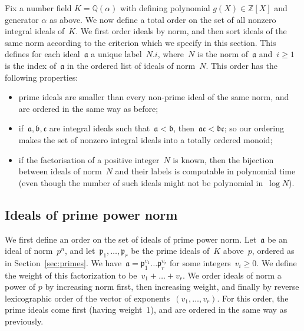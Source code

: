 \documentclass{article}
\def\Z{{\mathbb Z}}
\def\Q{{\mathbb Q}}
\def\a{{\mathfrak a}}
\def\b{{\mathfrak b}}
\def\idc{{\mathfrak c}}
\def\p{{\mathfrak p}}
\begin{document}
Fix a number field $K=\Q(\alpha)$ with defining polynomial
$g(X)\in\Z[X]$ and generator $\alpha$ as above.  We now define a total
order on the set of all nonzero integral ideals of~$K$.  We first
order ideals by norm, and then sort ideals of the same norm according
to the criterion which we specify in this section. This defines for
each ideal~$\a$ a unique label~$N.i$, where~$N$ is the norm of~$\a$
and~$i\ge 1$ is the index of~$\a$ in the ordered list of ideals of
norm~$N$.  This order has the following properties:
\begin{itemize}
  \item prime ideals are smaller than every non-prime ideal of the same norm,
    and are ordered in the same way as before;
  \item if~$\a,\b,\idc$ are integral ideals such that~$\a<\b$,
    then~$\a\idc<\b\idc$; so our ordering makes the set of nonzero
    integral ideals into a totally ordered monoid;
  \item if the factorisation of a positive integer~$N$ is known, then the
    bijection between ideals of norm~$N$ and their labels is computable in
    polynomial time (even though the number of such ideals might not be
    polynomial in~$\log N$).
\end{itemize}

\subsection{Ideals of prime power norm}\label{sec:primepowernorm}

We first define an order on the set of ideals of prime power
norm. Let~$\a$ be an ideal of norm~$p^n$, and let~$\p_1,\dots,\p_r$ be
the prime ideals of~$K$ above~$p$, ordered as in
Section~\ref{sec:primes}. We have~$\a = \p_1^{v_1}\dots \p_r^{v_r}$
for some integers~$v_i\ge 0$. We define the weight of this
factorization to be~$v_1+\dots+v_r$. We order ideals of norm a power
of $p$ by increasing norm first, then increasing weight, and finally
by reverse lexicographic order of the vector of
exponents~$(v_1,\dots,v_r)$. For this order, the prime ideals come
first (having weight~$1$), and are ordered in the same way as
previously.
\end{document}
